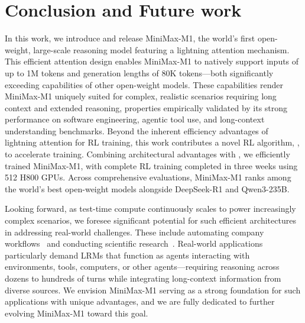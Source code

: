 \section{Conclusion and Future work}
In this work, we introduce and release MiniMax-M1, the world's first open-weight, large-scale reasoning model featuring a lightning attention mechanism. This efficient attention design enables MiniMax-M1 to natively support inputs of up to 1M tokens and generation lengths of 80K tokens---both significantly exceeding capabilities of other open-weight models. These capabilities render MiniMax-M1 uniquely suited for complex, realistic scenarios requiring long context and extended reasoning, properties empirically validated by its strong performance on software engineering, agentic tool use, and long-context understanding benchmarks.
Beyond the inherent efficiency advantages of lightning attention for RL training, this work contributes a novel RL algorithm, \method{}, to accelerate training. Combining architectural advantages with \method{}, we efficiently trained MiniMax-M1, with complete RL training completed in three weeks using 512 H800 GPUs. Across comprehensive evaluations, MiniMax-M1 ranks among the world's best open-weight models alongside DeepSeek-R1 and Qwen3-235B.

Looking forward, as test-time compute continuously scales to power increasingly complex scenarios, we foresee significant potential for such efficient architectures in addressing real-world challenges. These include automating company workflows~\citep{xu2025theagentcompanybenchmarkingllmagents} and conducting scientific research~\citep{si2024llmsgeneratenovelresearch,openai2025research}. Real-world applications particularly demand LRMs that function as agents interacting with environments, tools, computers, or other agents---requiring reasoning across dozens to hundreds of turns while integrating long-context information from diverse sources. We envision MiniMax-M1 serving as a strong foundation for such applications with unique advantages, and we are fully dedicated to further evolving MiniMax-M1 toward this goal.